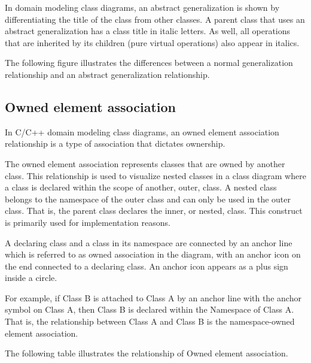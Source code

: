 \documentclass{book}
\begin{document}
In domain modeling class diagrams, an abstract generalization is shown by differentiating the title of the class from other classes.
A parent class that uses an abstract generalization has a class title in italic letters.
As well, all operations that are inherited by its children (pure virtual operations) also appear in italics.

The following figure illustrates the differences between a normal generalization relationship and an abstract generalization relationship.
\begin{figure}[H]
\begin{floatrow}
\end{floatrow}
\end{figure}

\subsection{Owned element association}
In C/C++ domain modeling class diagrams, an owned element association relationship is a type of association that dictates ownership.

The owned element association represents classes that are owned by another class.
This relationship is used to visualize nested classes in a class diagram where a class is declared within the scope of another, outer, class.
A nested class belongs to the namespace of the outer class and can only be used in the outer class.
That is, the parent class declares the inner, or nested, class. This construct is primarily used for implementation reasons.

A declaring class and a class in its namespace are connected by an anchor line which is referred to as owned association in the diagram,
with an anchor icon on the end connected to a declaring class. An anchor icon appears as a plus sign inside a circle.

For example, if Class B is attached to Class A by an anchor line with the anchor symbol on Class A, then Class B is declared within the Namespace of Class A.
That is, the relationship between Class A and Class B is the namespace-owned element association.

The following table illustrates the relationship of Owned element association.
\begin{figure}[H]
\begin{floatrow}
\end{floatrow}
\end{figure}
\end{document}
